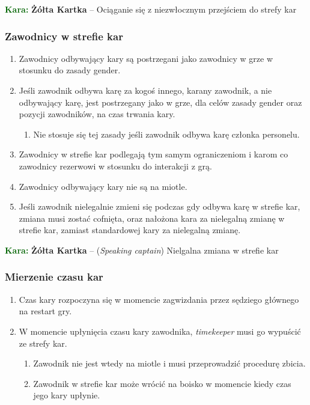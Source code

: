 \documentclass[11pt,a4paper]{article}
\newcommand\yellowcard[1]{\bgroup\textcolor{darkgreen}{\textbf{Kara: }}\bgroup\textcolor{darkyellow}{\textbf{Żółta Kartka}} -- #1}
\begin{document}
\yellowcard{Ociąganie się z niezwłocznym przejściem do strefy kar}

\subsubsection{Zawodnicy w strefie kar}
\begin{enumerate}
  \item Zawodnicy odbywający kary są postrzegani jako zawodnicy w grze w stosunku do zasady gender.
  \item Jeśli zawodnik odbywa karę za kogoś innego, karany zawodnik, a nie odbywający karę, jest postrzegany jako w grze, dla celów zasady gender oraz pozycji zawodników, na czas trwania kary.
  \begin{enumerate}
    \item Nie stosuje się tej zasady jeśli zawodnik odbywa karę członka personelu.
  \end{enumerate}
  \item Zawodnicy w strefie kar podlegają tym samym ograniczeniom i karom co zawodnicy rezerwowi w stosunku do interakcji z grą.
  \item Zawodnicy odbywający kary nie są na miotle.
  \item Jeśli zawodnik nielegalnie zmieni się podczas gdy odbywa karę w strefie kar, zmiana musi zostać cofnięta, oraz nałożona kara za nielegalną zmianę w strefie kar, zamiast standardowej kary za nielegalną zmianę.
\end{enumerate}

\yellowcard{(\emph{Speaking captain}) Nielgalna zmiana w strefie kar}

\subsubsection{Mierzenie czasu kar}
\begin{enumerate}
  \item Czas kary rozpoczyna się w momencie zagwizdania przez sędziego głównego na restart gry.
  \item W momencie upłynięcia czasu kary zawodnika, \emph{timekeeper} musi go wypuścić ze strefy kar.
  \begin{enumerate}
    \item Zawodnik nie jest wtedy na miotle i musi przeprowadzić procedurę zbicia.
    \item Zawodnik w strefie kar może wrócić na boisko w momencie kiedy czas jego kary upłynie.
  \end{enumerate}
\end{enumerate}
\end{document}
